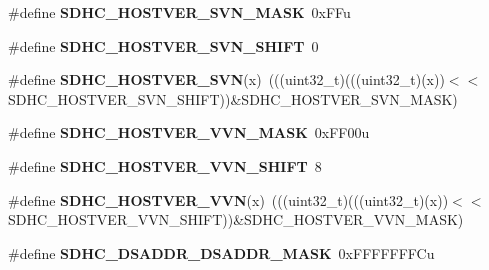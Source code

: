 \begin{DoxyCompactItemize}
\item 
\#define {\bfseries S\+D\+H\+C\+\_\+\+H\+O\+S\+T\+V\+E\+R\+\_\+\+S\+V\+N\+\_\+\+M\+A\+SK}~0x\+F\+Fu\hypertarget{group__SDHC__Register__Masks_ga922683bd06f7936f2978aac6f943ca90}{}\label{group__SDHC__Register__Masks_ga922683bd06f7936f2978aac6f943ca90}

\item 
\#define {\bfseries S\+D\+H\+C\+\_\+\+H\+O\+S\+T\+V\+E\+R\+\_\+\+S\+V\+N\+\_\+\+S\+H\+I\+FT}~0\hypertarget{group__SDHC__Register__Masks_gab6a2f24b88cbb5db5621995be9e56bcd}{}\label{group__SDHC__Register__Masks_gab6a2f24b88cbb5db5621995be9e56bcd}

\item 
\#define {\bfseries S\+D\+H\+C\+\_\+\+H\+O\+S\+T\+V\+E\+R\+\_\+\+S\+VN}(x)~(((uint32\+\_\+t)(((uint32\+\_\+t)(x))$<$$<$S\+D\+H\+C\+\_\+\+H\+O\+S\+T\+V\+E\+R\+\_\+\+S\+V\+N\+\_\+\+S\+H\+I\+FT))\&S\+D\+H\+C\+\_\+\+H\+O\+S\+T\+V\+E\+R\+\_\+\+S\+V\+N\+\_\+\+M\+A\+SK)\hypertarget{group__SDHC__Register__Masks_gabc6936d685c8222c70b386e4d59e230a}{}\label{group__SDHC__Register__Masks_gabc6936d685c8222c70b386e4d59e230a}

\item 
\#define {\bfseries S\+D\+H\+C\+\_\+\+H\+O\+S\+T\+V\+E\+R\+\_\+\+V\+V\+N\+\_\+\+M\+A\+SK}~0x\+F\+F00u\hypertarget{group__SDHC__Register__Masks_ga8fd5f14b61267f8ef598236b95cb3b7d}{}\label{group__SDHC__Register__Masks_ga8fd5f14b61267f8ef598236b95cb3b7d}

\item 
\#define {\bfseries S\+D\+H\+C\+\_\+\+H\+O\+S\+T\+V\+E\+R\+\_\+\+V\+V\+N\+\_\+\+S\+H\+I\+FT}~8\hypertarget{group__SDHC__Register__Masks_ga706bd372f8258fdf62c2e50ff2c5ee99}{}\label{group__SDHC__Register__Masks_ga706bd372f8258fdf62c2e50ff2c5ee99}

\item 
\#define {\bfseries S\+D\+H\+C\+\_\+\+H\+O\+S\+T\+V\+E\+R\+\_\+\+V\+VN}(x)~(((uint32\+\_\+t)(((uint32\+\_\+t)(x))$<$$<$S\+D\+H\+C\+\_\+\+H\+O\+S\+T\+V\+E\+R\+\_\+\+V\+V\+N\+\_\+\+S\+H\+I\+FT))\&S\+D\+H\+C\+\_\+\+H\+O\+S\+T\+V\+E\+R\+\_\+\+V\+V\+N\+\_\+\+M\+A\+SK)\hypertarget{group__SDHC__Register__Masks_ga41ed3752ccdbb977313a4b1c8c2574c2}{}\label{group__SDHC__Register__Masks_ga41ed3752ccdbb977313a4b1c8c2574c2}

\item 
\#define {\bfseries S\+D\+H\+C\+\_\+\+D\+S\+A\+D\+D\+R\+\_\+\+D\+S\+A\+D\+D\+R\+\_\+\+M\+A\+SK}~0x\+F\+F\+F\+F\+F\+F\+F\+Cu\hypertarget{group__SDHC__Register__Masks_ga0879039aa6d312f63642daf292ea07e1}{}\label{group__SDHC__Register__Masks_ga0879039aa6d312f63642daf292ea07e1}


\end{DoxyCompactItemize}
